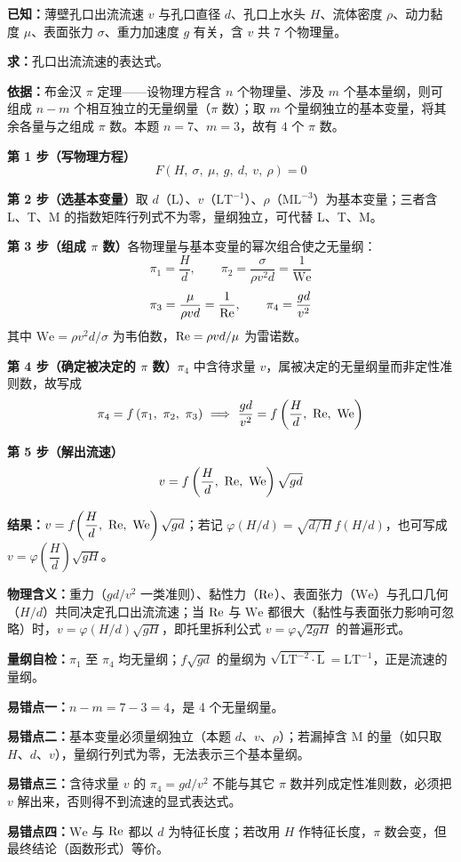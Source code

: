\begin{jie}
\textbf{已知：}薄壁孔口出流流速 $v$ 与孔口直径 $d$、孔口上水头 $H$、流体密度 $\rho$、动力黏度 $\mu$、表面张力 $\sigma$、重力加速度 $g$ 有关，含 $v$ 共 7 个物理量。

\textbf{求：}孔口出流流速的表达式。

\textbf{依据：}布金汉 $\pi$ 定理——设物理方程含 $n$ 个物理量、涉及 $m$ 个基本量纲，则可组成 $n-m$ 个相互独立的无量纲量（$\pi$ 数）；取 $m$ 个量纲独立的基本变量，将其余各量与之组成 $\pi$ 数。本题 $n=7$、$m=3$，故有 $4$ 个 $\pi$ 数。

\textbf{第 1 步（写物理方程）}\quad
\[F\left(H,\ \sigma,\ \mu,\ g,\ d,\ v,\ \rho\right)=0\]

\textbf{第 2 步（选基本变量）}\quad 取 $d$（$\mathrm{L}$）、$v$（$\mathrm{LT^{-1}}$）、$\rho$（$\mathrm{ML^{-3}}$）为基本变量；三者含 L、T、M 的指数矩阵行列式不为零，量纲独立，可代替 L、T、M。

\textbf{第 3 步（组成 $\pi$ 数）}\quad 各物理量与基本变量的幂次组合使之无量纲：
\[\pi_1=\frac{H}{d},\qquad \pi_2=\frac{\sigma}{\rho v^{2}d}=\frac{1}{\mathrm{We}}\]
\[\pi_3=\frac{\mu}{\rho vd}=\frac{1}{\mathrm{Re}},\qquad \pi_4=\frac{gd}{v^{2}}\]
其中 $\mathrm{We}=\rho v^{2}d/\sigma$ 为韦伯数，$\mathrm{Re}=\rho vd/\mu$ 为雷诺数。

\textbf{第 4 步（确定被决定的 $\pi$ 数）}\quad $\pi_4$ 中含待求量 $v$，属被决定的无量纲量而非定性准则数，故写成
\[\pi_4=f\left(\pi_1,\ \pi_2,\ \pi_3\right)\ \Longrightarrow\ \frac{gd}{v^{2}}=f\left(\frac{H}{d},\ \Rey,\ \mathrm{We}\right)\]

\textbf{第 5 步（解出流速）}\quad
\[v=f\left(\frac{H}{d},\ \Rey,\ \mathrm{We}\right)\sqrt{gd}\]

\textbf{结果：}$v=f\!\left(\dfrac{H}{d},\ \Rey,\ \mathrm{We}\right)\sqrt{gd}$；若记 $\varphi(H/d)=\sqrt{d/H}\,f(H/d)$，也可写成 $v=\varphi\!\left(\dfrac{H}{d}\right)\sqrt{gH}$。

\textbf{物理含义：}重力（$gd/v^{2}$ 一类准则）、黏性力（$\mathrm{Re}$）、表面张力（$\mathrm{We}$）与孔口几何（$H/d$）共同决定孔口出流流速；当 $\mathrm{Re}$ 与 $\mathrm{We}$ 都很大（黏性与表面张力影响可忽略）时，$v=\varphi(H/d)\sqrt{gH}$，即托里拆利公式 $v=\varphi\sqrt{2gH}$ 的普遍形式。

\textbf{量纲自检：}$\pi_1$ 至 $\pi_4$ 均无量纲；$f\sqrt{gd}$ 的量纲为 $\sqrt{\mathrm{LT^{-2}}\cdot\mathrm{L}}=\mathrm{LT^{-1}}$，正是流速的量纲。
\end{jie}

\begin{yicuo}
\textbf{易错点一：}$n-m=7-3=4$，是 4 个无量纲量。

\textbf{易错点二：}基本变量必须量纲独立（本题 $d$、$v$、$\rho$）；若漏掉含 M 的量（如只取 $H$、$d$、$v$），量纲行列式为零，无法表示三个基本量纲。

\textbf{易错点三：}含待求量 $v$ 的 $\pi_4=gd/v^{2}$ 不能与其它 $\pi$ 数并列成定性准则数，必须把 $v$ 解出来，否则得不到流速的显式表达式。

\textbf{易错点四：}$\mathrm{We}$ 与 $\mathrm{Re}$ 都以 $d$ 为特征长度；若改用 $H$ 作特征长度，$\pi$ 数会变，但最终结论（函数形式）等价。
\end{yicuo}


